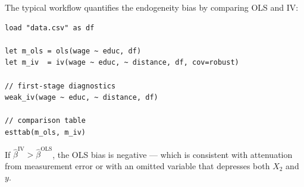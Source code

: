 The typical workflow quantifies the endogeneity bias by comparing OLS and IV:

\begin{lstlisting}[caption={Complete IV analysis workflow}]
load "data.csv" as df

let m_ols = ols(wage ~ educ, df)
let m_iv  = iv(wage ~ educ, ~ distance, df, cov=robust)

// first-stage diagnostics
weak_iv(wage ~ educ, ~ distance, df)

// comparison table
esttab(m_ols, m_iv)
\end{lstlisting}

If $\hat{\beta}^{\mathrm{IV}} > \hat{\beta}^{\mathrm{OLS}}$, the OLS bias
is negative --- which is consistent with attenuation from measurement error or with
an omitted variable that depresses both $X_2$ and $y$.
